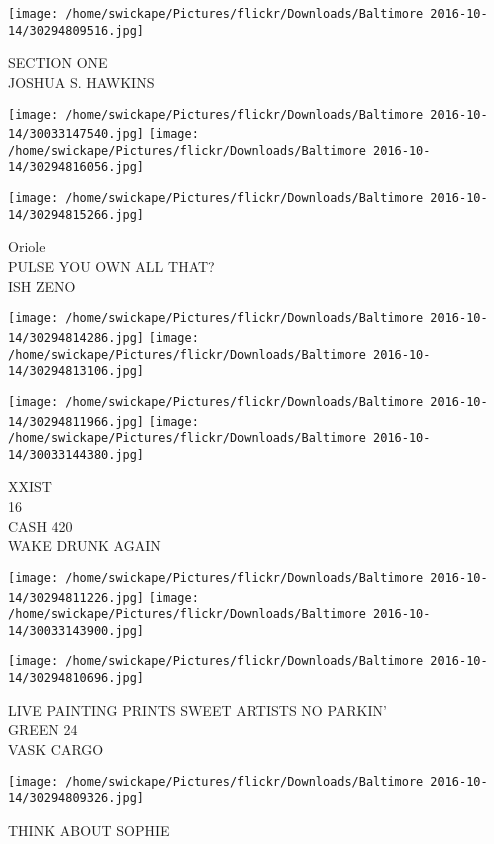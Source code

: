 \documentclass[10pt,letterpaper]{article}
\begin{document}
\vspace{0.25in}
\texttt{[image: /home/swickape/Pictures/flickr/Downloads/Baltimore 2016-10-14/30294809516.jpg]}

SECTION ONE\\
JOSHUA S. HAWKINS
\pagebreak

\texttt{[image: /home/swickape/Pictures/flickr/Downloads/Baltimore 2016-10-14/30033147540.jpg]}
\texttt{[image: /home/swickape/Pictures/flickr/Downloads/Baltimore 2016-10-14/30294816056.jpg]}

\vspace{0.25in}
\texttt{[image: /home/swickape/Pictures/flickr/Downloads/Baltimore 2016-10-14/30294815266.jpg]}

Oriole\\
PULSE YOU OWN ALL THAT?\\
ISH ZENO
\pagebreak

\texttt{[image: /home/swickape/Pictures/flickr/Downloads/Baltimore 2016-10-14/30294814286.jpg]}
\texttt{[image: /home/swickape/Pictures/flickr/Downloads/Baltimore 2016-10-14/30294813106.jpg]}

\texttt{[image: /home/swickape/Pictures/flickr/Downloads/Baltimore 2016-10-14/30294811966.jpg]}
\texttt{[image: /home/swickape/Pictures/flickr/Downloads/Baltimore 2016-10-14/30033144380.jpg]}

XXIST\\
16\\
CASH 420\\
WAKE DRUNK AGAIN
\pagebreak

\texttt{[image: /home/swickape/Pictures/flickr/Downloads/Baltimore 2016-10-14/30294811226.jpg]}
\texttt{[image: /home/swickape/Pictures/flickr/Downloads/Baltimore 2016-10-14/30033143900.jpg]}

\vspace{0.25in}
\texttt{[image: /home/swickape/Pictures/flickr/Downloads/Baltimore 2016-10-14/30294810696.jpg]}

LIVE PAINTING PRINTS SWEET ARTISTS NO PARKIN'\\
GREEN 24\\
VASK CARGO
\pagebreak

\texttt{[image: /home/swickape/Pictures/flickr/Downloads/Baltimore 2016-10-14/30294809326.jpg]}

THINK ABOUT SOPHIE
\pagebreak
\end{document}
